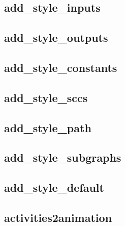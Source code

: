 \documentclass[letterpaper,10pt,english]{sphinxmanual}
\begin{document}
\subsection{add\_style\_inputs}
\label{\detokenize{InteractionGraphs:id10}}\label{\detokenize{InteractionGraphs:add-style-inputs}}

\subsection{add\_style\_outputs}
\label{\detokenize{InteractionGraphs:id11}}\label{\detokenize{InteractionGraphs:add-style-outputs}}

\subsection{add\_style\_constants}
\label{\detokenize{InteractionGraphs:id12}}\label{\detokenize{InteractionGraphs:add-style-constants}}

\subsection{add\_style\_sccs}
\label{\detokenize{InteractionGraphs:add-style-sccs}}\label{\detokenize{InteractionGraphs:id13}}

\subsection{add\_style\_path}
\label{\detokenize{InteractionGraphs:add-style-path}}\label{\detokenize{InteractionGraphs:id14}}

\subsection{add\_style\_subgraphs}
\label{\detokenize{InteractionGraphs:add-style-subgraphs}}\label{\detokenize{InteractionGraphs:id15}}

\subsection{add\_style\_default}
\label{\detokenize{InteractionGraphs:add-style-default}}\label{\detokenize{InteractionGraphs:id16}}

\subsection{activities2animation}
\label{\detokenize{InteractionGraphs:id17}}\label{\detokenize{InteractionGraphs:activities2animation}}
\end{document}
